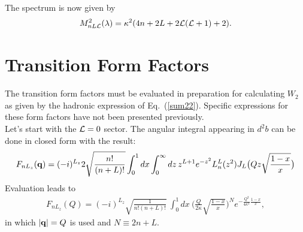\documentclass[aps,prd,amsmath,longbibliography]{revtex4-1}
\newcommand{\eq}[1]{Eq.~(\ref{#1})}
\def\bea{\begin{eqnarray}}
\def\eea{\end{eqnarray}}\def\a{\alpha}\newcommand{\bfk}{{\bf k}}\newcommand{\bfq}{{\bf q}}
\def\calL{{\cal L}}\def\cL{{\cal L}}\def\GX{\Gamma_X}\def\o{\omega}\def\bfb{{\bf b}}
\begin{document}
{%


The spectrum is now given by
\bea
M^2_{nL\cL}(\l)=\k^2(4n +2L+ 2\calL(\calL+1)+2).\label{spect}\eea



 



\section{Transition  Form Factors}
The transition form factors must be evaluated in preparation for calculating $W_2$ as given by the hadronic expression of \eq{sum22}.
Specific expressions for  these form factors have not been presented previously. 
\\

Let's start with the $\calL=0$ sector. The angular integral appearing in $d^2b$ can be done in closed form with the result:
		\bea F_{nL_z}(\bfq)
= (-i)^{L_z}  {2  } \sqrt{n!\over (n+L)!}\int_0^1dx\int_0^\infty dz\,  z^{L+1}e^{-z^2}L_n^L(z^2)J_L\big(Qz\sqrt{1-x\over x}\big)\eea
Evaluation leads to
	\bea F_{nL_z}(Q) =   {(-i)^{L_z}}\sqrt{\frac{1}{n!(n+L)!}} \ \int_{0}^{1}dx \ \bigg( \frac{Q}{2\kappa}\sqrt{\frac{1-x}{x}} \bigg)^N  e^{-\frac{Q^2}{4\kappa^2}\frac{1-x}{x}},\label{fint} \eea
in which $|\bfq|=Q$ is used and $N\equiv 2n +L$. %
	
}
\end{document}
